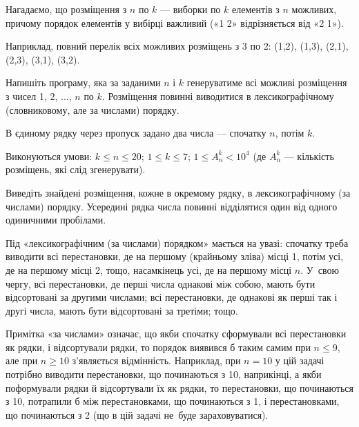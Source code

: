 ﻿ Нагадаємо, що розміщення з $n$ по $k$ --- виборки по $k$ елементів з $n$ можливих, причому порядок елементів у вибірці важливий («1 2» відрізняється від «2 1»).

Наприклад, повний перелік всіх можливих розміщень з 3 по 2: (1,2), (1,3), (2,1), (2,3), (3,1), (3,2).

Напишіть програму, яка за заданими $n$ і $k$ генеруватиме всі можливі розміщення з чисел 1, 2, ..., $n$ по $k$. Розміщення повинні виводитися в лексикографічному (словниковому, але за числами) порядку.

\InputFile
В єдиному рядку через пропуск задано два числа --- спочатку $n$, потім $k$.

Виконуються умови: $k\leqslant n\leqslant 20$; $1\leqslant k\leqslant 7$; $1\leqslant A_n^k < 10^4$ (де $A_n^k$ --- кількість розміщень, які слід згенерувати).

\OutputFile
Виведіть знайдені розміщення, кожне в окремому рядку, в лексикографічному (за числами) порядку. Усередині рядка числа повинні відділятися один від одного одиничними пробілами.

\Examples
\begin{example}
\end{example}

\Note

Під «лексикографічним (за числами) порядком» мається на увазі: спочатку треба виводити всі перестановки, де на першому (крайньому зліва) місці 1, потім усі, де на першому місці 2, тощо, насамкінець усі, де на першому місці $n$. У~свою чергу, всі перестановки, де перші числа однакові між собою, мають бути відсортовані за другими числами; всі перестановки, де однакові як перші так і другі числа, мають бути відсортовані за третіми; тощо.

Примітка «за числами» означає, що якби спочатку сформували всі перестановки як рядки, і відсортували рядки, то порядок виявився б таким самим при $n\leqslant 9$, але при $n\geqslant 10$ з'являється відмінність. Наприклад, при $n=10$ у цій задачі потрібно виводити перестановки, що починаються з 10, наприкінці, а якби поформували рядки й відсортували їх як рядки, то перестановки, що починаються з 10, потрапили б між перестановками, що починаються з 1, і перестановками, що починаються з 2 (що в цій задачі не~буде зараховуватися).